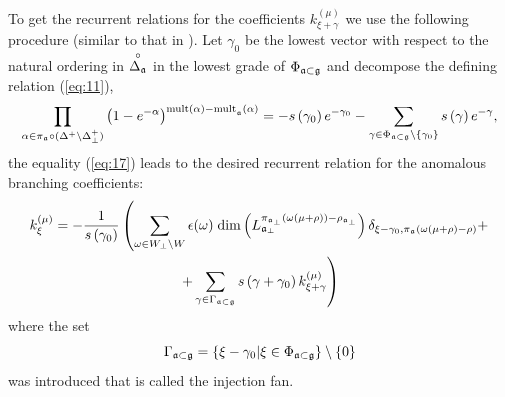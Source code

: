 \documentclass[a4paper,12pt]{article}
\theoremstyle{definition} \newtheorem{Def}{Definition}
\newcommand{\co}[1]{\overset{\circ }{#1}}
\begin{document}
To get the recurrent relations for the coefficients $k^{(\mu)}_{\xi+\gamma}$ we use the following procedure  (similar to that in \cite{ilyin812pbc}).
Let $\gamma_{0} $ be the lowest vector with respect to the natural ordering in $%
\co{\Delta _{\frak{a}}}$ in the lowest grade of $\Phi _{\frak{a}\subset \frak{g}}$ and decompose the defining relation (\ref{eq:11}),
\begin{equation}
  \label{eq:18}
  \prod_{\alpha\in \pi_{\mathfrak{a}}\circ (\Delta^{+}\setminus \Delta^{+}_{\bot})}\left(
    1-e^{-\alpha }\right) ^{\mathrm{{mult}\left( \alpha \right) -{mult}}_{\frak{a%
      }}\mathrm{\left( \alpha \right) }}=-s\left( \gamma _{0}\right) e^{-\gamma
    _{0}}-\sum_{\gamma \in \Phi _{\frak{a}\subset \frak{g}}\setminus \left\{\gamma_{0}\right\}}s\left( \gamma \right) e^{-\gamma },
\end{equation}
the equality (\ref{eq:17}) leads to the desired recurrent  relation for the anomalous branching coefficients:
\begin{multline}
  k_{\xi }^{\left( \mu \right) }=
  -\frac{1}{s\left( \gamma _{0}\right) }
  \left(
    \sum_{\omega\in W_{\bot}\backslash W} \epsilon(\omega)\; \mathrm{dim}
    \left(L^{\pi_{\mathfrak{a}_{\bot}}(\omega(\mu+\rho))-\rho_{\mathfrak{a}_{\bot}}}_{\mathfrak{a}_{\bot}}\right)
    \delta_{\xi-\gamma_0,\pi_{\mathfrak{a}}(\omega(\mu+\rho)-\rho)}+
    \right.\\
    \left. +
    \sum_{\gamma \in \Gamma _{\frak{a}\subset \frak{g}}} s\left( \gamma +\gamma _{0}\right) k_{\xi+\gamma }^{\left( \mu \right) }
  \right)
\label{recurrent-relation}
\end{multline}
where the set
\begin{equation}
\Gamma _{\frak{a}\subset \frak{g}}=\left\{ \xi -\gamma _{0}|\xi \in \Phi _{%
\frak{a}\subset \frak{g}}\right\} \setminus \left\{ 0\right\} 
\label{fan-defined}
\end{equation}
 was introduced that is called the injection fan.
\end{document}
